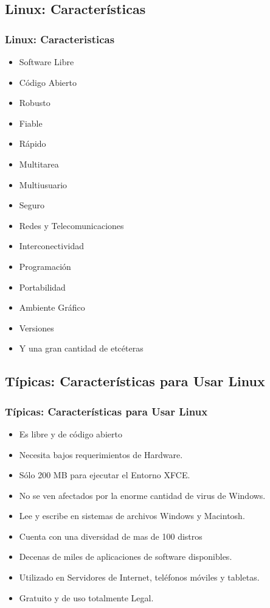 \documentclass[9pt,t]{beamer}
\begin{document}
\subsection{Linux: Características}
\begin{frame}\justifying
  \frametitle{Linux: Caracteristicas}    
  
    \begin{multicols}{2}
    \begin{itemize}\justifying
      \item Software Libre
      \item Código Abierto
      \item Robusto
      \item Fiable
      \item Rápido
      \item Multitarea
      \item Multiusuario
      \item Seguro
      \item Redes y Telecomunicaciones
      \item Interconectividad
      \item Programación
      \item Portabilidad
      \item Ambiente Gráfico
      \item Versiones
      \item Y una gran cantidad de etcéteras
    \end{itemize}
    \end{multicols}
\end{frame}


\subsection{Típicas: Características para Usar Linux}
\begin{frame}\justifying
  \frametitle{Típicas: Características para Usar Linux}
  
   \begin{itemize}\justifying
      \item Es libre y de código abierto
      \item Necesita bajos requerimientos de Hardware.
      \item Sólo 200 MB para ejecutar el Entorno XFCE.
      \item No se ven afectados por la enorme cantidad de virus de Windows.
      \item Lee y escribe en sistemas de archivos Windows y Macintosh.
      \item Cuenta con una diversidad de mas de 100 distros
      \item Decenas de miles de aplicaciones de software disponibles.
      \item Utilizado en Servidores de Internet, teléfonos móviles y tabletas.
      \item Gratuito y de uso totalmente Legal.
   \end{itemize}
\end{frame}
\end{document}
